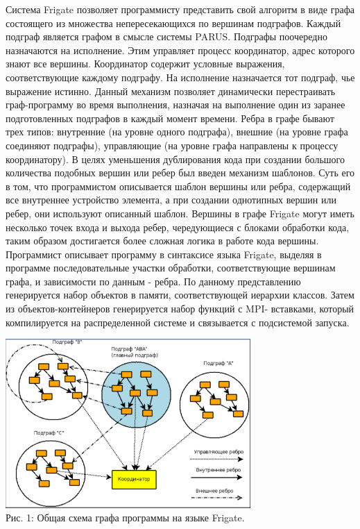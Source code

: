 \documentclass[a4paper, 12pt]{article}
\begin{document}
Система Frigate позволяет программисту представить свой алгоритм в виде графа состоящего из множества непересекающихся по вершинам подграфов. Каждый подграф является графом в смысле системы PARUS. Подграфы поочередно назначаются на исполнение. Этим управляет процесс координатор, адрес которого знают все вершины. Координатор содержит условные выражения, соответствующие каждому подграфу. На исполнение назначается тот подграф, чье выражение истинно. Данный механизм позволяет динамически перестраивать граф-программу во время выполнения, назначая на выполнение один из заранее подготовленных подграфов в каждый момент времени.
Ребра в графе бывают трех типов: внутренние (на уровне одного подграфа), внешние (на уровне графа соединяют подграфы), управляющие (на уровне графа направлены к процессу координатору). В целях уменьшения дублирования кода при создании большого количества подобных вершин или ребер был введен механизм шаблонов. Суть его в том, что программистом описывается шаблон вершины или ребра, содержащий все внутреннее устройство элемента, а при создании однотипных вершин или ребер, они используют описанный шаблон.
Вершины в графе Frigate могут иметь несколько точек входа и выхода ребер, чередующиеся с блоками обработки кода, таким образом достигается более сложная логика в работе кода вершины.
Программист описывает программу в синтаксисе языка Frigate, выделяя в программе последовательные участки обработки, соответствующие вершинам графа, и зависимости по данным - ребра. По данному представлению генерируется набор объектов в памяти, соответствующей иерархии классов. Затем из объектов-контейнеров генерируется набор функций с MPI- вставками, который компилируется на распределенной системе и связывается с подсистемой запуска.

\begin{center}
\includegraphics[width=0.7\textwidth]{pic_1.png}\\
Рис. 1: Общая схема графа программы на языке Frigate. \label{pic_3}
\end{center}
\end{document}
